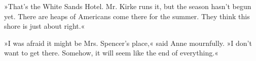 »That's the White Sands Hotel. Mr. Kirke runs it, but the season hasn't begun yet. There are heaps of Americans come there for the summer. They think this shore is just about right.«

»I was afraid it might be Mrs. Spencer's place,« said Anne mournfully. »I don't want to get there. Somehow, it will seem like the end of everything.«